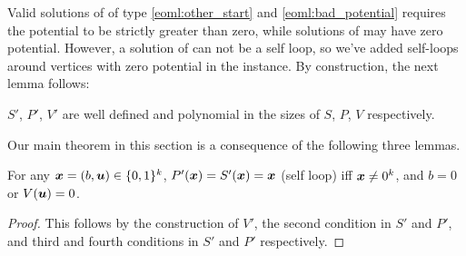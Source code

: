 Valid solutions of \EOML of type \ref{eoml:other_start} and \ref{eoml:bad_potential} requires the potential to be strictly greater than zero, while solutions of \EOPL may have zero potential. However, a solution of \EOPL can not be a self loop, so we've added self-loops around vertices with zero potential in the \EOPL instance.
By construction, the next lemma follows:
\begin{lemma}\label{lem:m2p-valid}
$S'$, $P'$, $V'$ are well defined and polynomial in the sizes of $S$, $P$, $V$ respectively. 
\end{lemma}

Our main theorem in this section is a consequence of the following three lemmas.

\begin{lemma}\label{lem:m2p-sl}
For any $\mbox{\boldmath $x$}=(b,\mbox{\boldmath $u$})\in \{0,1\}^k$, $P'(\mbox{\boldmath $x$})=S'(\mbox{\boldmath $x$})=\mbox{\boldmath $x$}$ (self loop) iff $\mbox{\boldmath $x$}\neq 0^k$, and $b=0$ or $V(\mbox{\boldmath $u$})=0$.
\end{lemma}
\begin{proof}
This follows by the construction of $V'$, the second condition in $S'$ and $P'$, and third and fourth conditions in $S'$ and $P'$ respectively. 
\end{proof}


